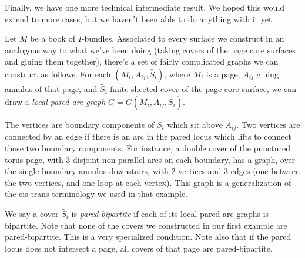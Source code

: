 \documentclass[12pt]{amsart}
\theoremstyle{definition}
\theoremstyle{remark}
\begin{document}
Finally, we have one more technical intermediate result. We hoped this would
extend to more cases, but we haven't been able to do anything with it yet.

Let $M$ be a book of $I$-bundles. Associated to every surface we construct in
an analogous way to what we've been doing (taking covers of the page core
surfaces and gluing them together), there's a set of fairly complicated graphs
we can construct as follows. For each $(M_i,A_{ij},\widetilde{S_i})$, where
$M_i$ is a page, $A_{ij}$ gluing annulus of that page, and $\widetilde{S_i}$
finite-sheeted cover of the page core surface, we can draw a \emph{local
pared-arc graph} $G=G(M_i,A_{ij},\widetilde{S_i})$.

The vertices are boundary components of $\widetilde{S_i}$ which sit above
$A_{ij}$. Two vertices are connected by an edge if there is an arc in the pared
locus which lifts to connect those two boundary components. For instance,
a double cover of the punctured torus page, with 3 disjoint non-parallel arcs
on each boundary, has a graph, over the single boundary annulus downstairs,
with 2 vertices and 3 edges (one between the two vertices, and one loop at each
vertex). This graph is a generalization of the cis-trans terminology we used in
that example.

We say a cover $\widetilde{S_i}$ is \emph{pared-bipartite} if each of its local
pared-arc graphs is bipartite. Note that none of the covers we constructed in
our first example are pared-bipartite. This is a very specialized condition.
Note also that if the pared locus does not intersect a page, all covers of that
page are pared-bipartite.
\end{document}
